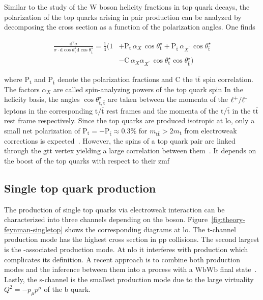 Similar to the study of the $\mathrm{W}$ boson helicity fractions in top quark decays, the polarization of the top quarks arising in pair production can be analyzed by decomposing the \ttbar cross section as a function of the polarization angles. One finds

\begin{align}
\frac{\mathrm{d}^{2}\sigma}{\sigma\cdot\mathrm{d}\cos\theta_\mathrm{t}^\star\mathrm{d}\cos\theta_{\bar{\mathrm{t}}}^\star}=\frac{1}{4}\Big(1&+\mathrm{P}_\mathrm{t}\,\alpha_{X}\,\cos\theta_\mathrm{t}^\star+\mathrm{P}_{\bar{\mathrm{t}}}\,\alpha_{X^\prime}\,\cos\theta_{\bar{\mathrm{t}}}^\star \nonumber \\
&-\mathrm{C}\,\alpha_{X}\alpha_{X^\prime}\,\cos\theta_\mathrm{t}^\star \cos\theta_{\bar{\mathrm{t}}}^\star\Big)
\end{align}

where $\mathrm{P}_\mathrm{t}$ and $\mathrm{P}_{\bar{\mathrm{t}}}$ denote the polarization fractions and $\mathrm{C}$ the $\mathrm{t\bar{t}}$ spin correlation. The factors $\alpha_{X}$ are called spin-analyzing powers of the top quark spin   In the helicity basis, the angles $\cos\theta_{\mathrm{t},\bar{\mathrm{t}}}^\star$ are taken between the momenta of the $\ell^{\rmplus}/\ell^{\rmminus}$ leptons in the corresponding $\mathrm{t}/\bar{\mathrm{t}}$ rest frames and the momenta of the $\mathrm{t}/\bar{\mathrm{t}}$ in the $\mathrm{t}\bar{\mathrm{t}}$ rest frame respectively. Since the top quarks are produced isotropic at \gls{lo}, only a small net polarization of $\mathrm{P}_\mathrm{t}=-\mathrm{P}_{\bar{\mathrm{t}}}\approx0.3\%$ for $m_\mathrm{t\bar{t}}>2m_\mathrm{t}$ from electroweak corrections is expected~\cite{Bernreuther:2013aga}. However, the spins of a top quark pair are linked through the $\mathrm{g\mathrm{t}\bar{\mathrm{t}}}$ vertex yielding a large correlation between them~\cite{Mahlon:2010gw}. It depends on the boost of the top quarks with respect to their zmf



\subsection{Single top quark production}

The production of single top quarks via electroweak interaction can be characterized into three channels depending on the \wboson boson. Figure~\ref{fig:theory-feynman-singletop} shows the corresponding diagrams at \gls{lo}. The t-channel production mode has the highest cross section in $\mathrm{pp}$ collisions. The second largest is the \wboson-associated production mode. At \gls{nlo} it interferes with \ttbar production which complicates its definition. A recent approach is to combine both production modes and the inference between them into a process with a $\mathrm{WbWb}$ final state~\cite{Cascioli:2013wga}. Lastly, the s-channel is the smallest production mode due to the large virtuality $Q^{2}=-p_{\mu}p^{\mu}$ of the b quark.

